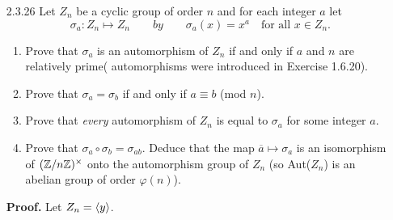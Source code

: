 \begin{enumerate}
      \textbf{Proof.} We will only prove the second part. Let $G$ be a group of
      order $n$, $(k, n) = 1$, and $x \mapsto x^k$ be a map from $G$ to itself.
      Let $y \in G$. Since $k$ is relatively prime to $n$, there exist integers 
      $a$ and $b$ such that $ak+bn=1$. By Lagrange's Theorem, $|\cyc{y}|$
      divides $n$. Since $|y| = |\cyc{y}|$ (Proposition 2), write $n = j|y|$ for
      some integer $j$. Using our map, we get
      \begin{align*}
         y^a &\mapsto (y^a)^k = y^{ak} \\
           &= y^{ak}\cdot 1^{jb} \\
           &= y^{ak}(y^{|y|})^{jb} \\
           &= y^{ak}(y^{nb}) \\
           &= y^{ak+nb} = y^1 = y,
      \end{align*}
      so that the map is surjective. \qed
   \item[2.3.26]  Let $Z_n$ be a cyclic group of order $n$ and for each integer
                  $a$ let
                  $$\sigma_a : Z_n \mapsto Z_n \qquad by \qquad \sigma_a(x) =
                  x^a \quad \text{for all } x \in Z_n.$$
                  \begin{enumerate}
                     \item Prove that $\sigma_a$ is an automorphism of $Z_n$ if
                           and only if $a$ and $n$ are relatively prime(
                           automorphisms were introduced in Exercise 1.6.20).
                     \item Prove that $\sigma_a = \sigma_b$ if and only if
                           $a \equiv b$ (mod $n$).
                     \item Prove that \textit{every} automorphism of $Z_n$ is
                           equal to $\sigma_a$ for some integer $a$.
                     \item Prove that $\sigma_a\circ\sigma_b=\sigma_{ab}$.
                           Deduce that the map $\overline{a} \mapsto \sigma_a$
                           is an isomorphism of $(\mathbb{Z}/n\mathbb{Z})^\times$ onto the
                           automorphism group of $Z_n$ (so Aut($Z_n$) is an
                           abelian group of order $\varphi(n)$).
                  \end{enumerate}

      \textbf{Proof.} Let $Z_n = \langle y \rangle$. 


\end{enumerate}
